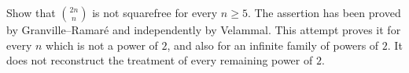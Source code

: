 Show that $\binom{2n}{n}$ is not squarefree for every $n\geq5$.
The assertion has been proved by Granville--Ramar\'e and independently
by Velammal. This attempt proves it for every $n$ which is not a power
of $2$, and also for an infinite family of powers of $2$. It does not
reconstruct the treatment of every remaining power of $2$.
